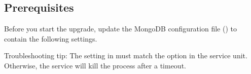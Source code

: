 \documentclass[letterpaper,10pt,english]{sphinxmanual}
\begin{document}
\subsection{Prerequisites}
\label{\detokenize{install/upgrade-from-mongodb:prerequisites}}
\sphinxAtStartPar
Before you start the upgrade, update the MongoDB configuration file
() to contain the following settings.

\begin{sphinxVerbatim}[commandchars=\\\{\}]
\end{sphinxVerbatim}

\sphinxAtStartPar
Troubleshooting tip: The  setting in  must  match the  option in the  service unit. Otherwise, the service will kill the  process after a timeout.
\end{document}
